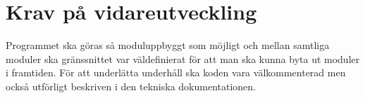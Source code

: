 \section{Krav på vidareutveckling}
Programmet ska göras så moduluppbyggt som möjligt och mellan samtliga moduler ska gränssnittet var väldefinierat för att man ska kunna byta ut moduler i framtiden. För att underlätta underhåll ska koden vara välkommenterad men också utförligt beskriven i den tekniska dokumentationen. 
\begin{LIPSkravlista}
\end{LIPSkravlista}
